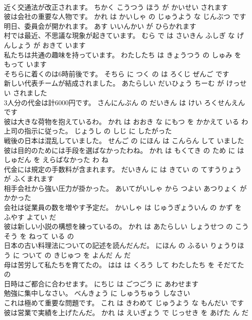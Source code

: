 \documentclass[8pt]{extreport}
\begin{document}
\begin{CJK}{UTF8}{min}
\\	近く交通法が改正されます。	ちかく こうつう ほう が かいせい されます 
\\	彼は会社の重要な人物です。	かれ は かいしゃ の じゅうよう な じんぶつ です 
\\	明日、委員会が開かれます。	あす いいんかい が ひらかれます 
\\	村では最近、不思議な現象が起きています。	むら で は さいきん ふしぎ な げんしょう が おきて います 
\\	私たちは共通の趣味を持っています。	わたしたち は きょうつう の しゅみ を もって います 
\\	そちらに着くのは6時前後です。	そちら に つく の は ろくじ ぜんご です 
\\	新しい代表チームが結成されました。	あたらしい だいひょう ちーむ が けっせい されました 
\\	3人分の代金は計6000円です。	さんにんぶん の だいきん は けい ろくせんえん です 
\\	彼は大きな荷物を抱えているわ。	かれ は おおき な にもつ を かかえて いる わ 
\\	上司の指示に従った。	じょうし の しじ に したがった 
\\	戦後の日本は混乱していました。	せんご の にほん は こんらん して いました 
\\	彼は目的のためには手段を選ばなかったわね。	かれ は もくてき の ため に は しゅだん を えらばなかった わ ね 
\\	代金には規定の手数料が含まれます。	だいきん に は きてい の てすうりょう が ふくまれます 
\\	相手会社から強い圧力が掛かった。	あいてがいしゃ から つよい あつりょく が かかった 
\\	会社は従業員の数を増やす予定だ。	かいしゃ は じゅうぎょういん の かず を ふやす よてい だ 
\\	彼は新しい小説の構想を練っているの。	かれ は あたらしい しょうせつ の こうそう を ねって いる の 
\\	日本の古い料理法についての記述を読んだんだ。	にほん の ふるい りょうりほう に ついて の きじゅつ を よんだ ん だ 
\\	母は苦労して私たちを育てたの。	はは は くろう して わたしたち を そだてた の 
\\	日時はご都合に合わせます。	にちじ は ごつごう に あわせます 
\\	勉強に集中しなさい。	べんきょう に しゅうちゅう しなさい 
\\	これは極めて重要な問題です。	これ は きわめて じゅうよう な もんだい です 
\\	彼は営業で実績を上げたんだ。	かれ は えいぎょう で じっせき を あげた ん だ 

\end{CJK}
\end{document}
